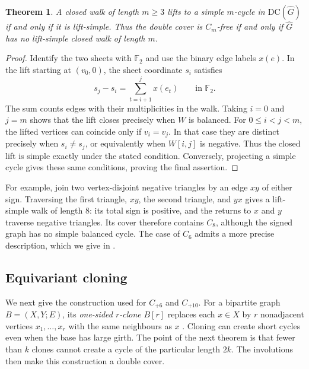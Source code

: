 \documentclass{article}
\newcommand{\DC}{\mathrm{DC}}
\newcommand{\FF}{\mathbb{F}}
\newtheorem{theorem}{Theorem}[section]
\theoremstyle{definition}
\theoremstyle{remark}
\begin{document}
\begin{theorem}\label{thm:cycle-lift}
A closed walk of length $m\geq3$ lifts to a simple $m$-cycle in
$\DC(\widehat G)$ if and only if it is lift-simple.  Thus the double cover is
$C_m$-free if and only if $\widehat G$ has no lift-simple closed walk of
length $m$.
\end{theorem}
\begin{proof}
Identify the two sheets with $\FF_2$ and use the binary edge labels $x(e)$.
In the lift starting at $(v_0,0)$, the sheet coordinate $s_i$ satisfies
\[
s_j-s_i=\sum_{t=i+1}^{j}x(e_t)\qquad\text{in }\FF_2.
\]
The sum counts edges with their multiplicities in the walk.  Taking
$i=0$ and $j=m$ shows that the lift closes precisely when $W$ is balanced.
For $0\leq i<j<m$, the lifted vertices can coincide only if $v_i=v_j$.
In that case they are distinct precisely when $s_i\ne s_j$, or equivalently
when $W[i,j]$ is negative.  Thus the closed lift is simple exactly under
the stated condition.  Conversely, projecting a simple cycle gives these
same conditions, proving the final assertion.
\end{proof}

For example, join two vertex-disjoint negative triangles by an edge $xy$
of either sign.  Traversing the first triangle, $xy$, the second triangle,
and $yx$ gives a lift-simple walk of length $8$: its total sign is positive,
and the returns to $x$ and $y$ traverse negative triangles.  Its cover
therefore contains $C_8$, although the signed graph has no simple balanced
cycle.  The case of $C_6$ admits a more precise description, which we give
in .

\subsection{Equivariant cloning}

We next give the construction used for $C_{+6}$ and $C_{+10}$.  For a
bipartite graph $B=(X,Y;E)$, its \emph{one-sided $r$-clone} $B[r]$ replaces
each $x\in X$ by $r$ nonadjacent vertices $x_1,\ldots,x_r$ with the same
neighbours as $x$ \cite{LUW1999}.  Cloning can create short cycles even
when the base has large girth.  The point of the next theorem is that fewer
than $k$ clones cannot create a cycle of the particular length $2k$.
The involutions then make this construction a double cover.
\end{document}
